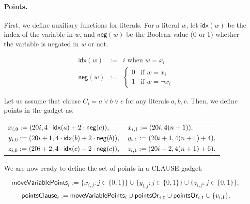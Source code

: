 \paragraph{Points.}

\newcommand{\pointsClause}[1]{\mathsf{pointsClause}_{#1}}
\newcommand{\negate}{\mathsf{neg}}
\newcommand{\idx}{\mathsf{idx}}


First, we define auxiliary functions for literals. 
For a literal $w$, let $\idx(w)$ be the index of the variable in $w$,
and $\negate(w)$ be the Boolean value (0 or 1) whether the variable is negated in $w$
or not.

\begin{eqnarray*}
\idx(w) & := &  i \text{ when } w = x_i \\
\negate(w) & := & 
\begin{cases}
 0 & \text{if } w = x_i \\
 1 & \text{if } w = \neg x_i
\end{cases}
\end{eqnarray*}

Let us assume that clause $C_i = a \lor b \lor c$
for any literals $a,b,c$. Then, we define points in the gadget as:

\begin{center}
\begin{tabular}{ l l }
	$x_{i, 0} := (\clauseXFactor i, 4\cdot \idx(a) + 2\cdot \negate(c)),$ &
	$x_{i, 1} := (20 i, 4(n+1)),$ \\
	$y_{i, 0} := (\clauseXFactor i+1, 4\cdot \idx(b) + 2\cdot \negate(b)),$ &
	$y_{i, 1} := (20 i+1, 4(n+1) + 4),$ \\
	$z_{i, 0} := (\clauseXFactor i+2, 4\cdot \idx(c) + 2\cdot \negate(c)),$ &
	$z_{i, 1} := (20 i+2, 4(n+1) + 6).$
\end{tabular}
\end{center}

\newcommand{\segmentsClause}{\mathsf{segmentsClause}}	
\newcommand{\moveVariablePoints}[1]{\mathsf{moveVariablePoints}_{#1}}
\newcommand{\moveVariableSegments}[1]{\mathsf{moveVariableSegments}_{#1}}
 
We are now ready to define the set of points in a CLAUSE-gadget:
 
 $$\moveVariablePoints{i} := 
 \{x_{i, j} : j \in \{0, 1\}\} \cup
 \{y_{i, j} : j \in \{0, 1\}\} \cup
 \{z_{i, j} : j \in \{0, 1\}\},
 $$
 $$\pointsClause{i} := 
 \moveVariablePoints{i} \cup \pointsOr{i}{0}
 \cup \pointsOr{i}{1} \cup \{v_{i, 1} \}.
 $$
 
